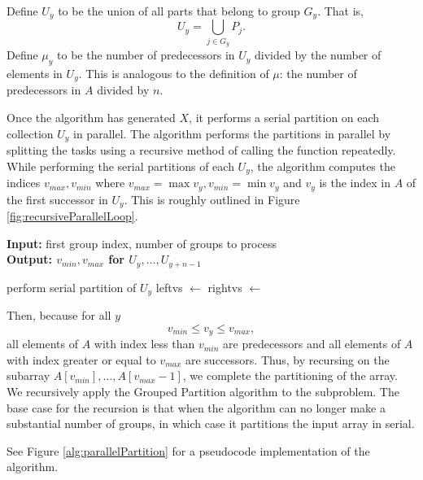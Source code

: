 \documentclass[twocolumn, twoside, 12pt]{article}
\begin{document}
Define $U_y$ to be the union of all parts that belong to group $G_y$. That is,
$$U_y = \bigcup_{j\in G_y} P_j.$$
Define $\mu_y$ to be the number of predecessors in $U_y$ divided by the number of elements in $U_y$. This is analogous to the definition of $\mu$: the number of predecessors in $A$ divided by $n$.

Once the algorithm has generated $X$, it performs a serial partition on each collection $U_y$ in parallel. 
The algorithm performs the partitions in parallel by splitting the tasks using a recursive method of calling the function repeatedly.
While performing the serial partitions of each $U_y$, the algorithm computes the indices $v_{max}, v_{min}$ where $v_{max}=\max{v_y}, v_{min}=\min v_y$ and $v_y$ is the index in $A$ of the first successor in $U_y$.
This is roughly outlined in Figure \ref{fig:recursiveParallelLoop}.
\begin{figure*}
	\caption{Recursive Spawning Implementation of Parallel For Loop}
	\label{fig:recursiveParallelLoop}
	\textbf{Input:} first group index, number of groups to process\\
	\textbf{Output: $v_{min}, v_{max}$ for $U_y,\ldots, U_{y+n-1}$}
	\begin{algorithmic}[1]
				\State perform serial partition of $U_y$
				\State{}
			\Else
				\State leftvs $\gets$ 
				\State rightvs $\gets$ 
				\State{}
			\EndIf
		\EndProcedure
	\end{algorithmic}	
\end{figure*}

Then, because for all $y$ 
$$v_{min}\leq v_{y} \leq v_{max},$$
all elements of $A$ with index less than $v_{min}$ are predecessors and all elements of $A$ with index greater or equal to $v_{max}$ are successors.
Thus, by recursing on the subarray $A[v_{min}],\ldots,A[v_{max}-1]$, we complete the partitioning of the array.
We recursively apply the Grouped Partition algorithm to the subproblem.
The base case for the recursion is that when the algorithm can no longer make a substantial number of groups, in which case it partitions the input array in serial.

See Figure \ref{alg:parallelPartition} for a pseudocode implementation of the algorithm.
\end{document}
